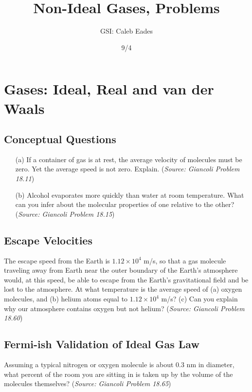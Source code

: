 \documentclass{article}
\begin{document}
	
\title{Non-Ideal Gases, Problems}
\author{GSI: Caleb Eades}
\date{9/4}
\maketitle

\section{Gases: Ideal, Real and van der Waals}

\subsection{Conceptual Questions}

\begin{itemize}
	\item[(a)] If a container of gas is at rest, the average velocity of molecules must be zero. Yet the average speed is not zero. Explain. (\textit{Source: Giancoli Problem 18.11})
	\item[(b)] Alcohol evaporates more quickly than water at room temperature. What can you infer about the molecular properties of one relative to the other? (\textit{Source: Giancoli Problem 18.15})
\end{itemize}

\subsection{Escape Velocities}

The escape speed from the Earth is $1.12\times10^4$ m/s, so that a gas molecule traveling away from Earth near the outer boundary of the Earth's atmosphere would, at this speed, be able to escape from the Earth's gravitational field and be lost to the atmosphere. At what temperature is the average speed of (a) oxygen molecules, and (b) helium atoms equal to $1.12\times10^4$ m/s? (c) Can you explain why our atmosphere contains oxygen but not helium? (\textit{Source: Giancoli Problem 18.60})

\subsection{Fermi-ish Validation of Ideal Gas Law}

Assuming a typical nitrogen or oxygen molecule is about $0.3$ nm in diameter, what percent of the room you are sitting in is taken up by the volume of the molecules themselves? (\textit{Source: Giancoli Problem 18.65})
\end{document}
